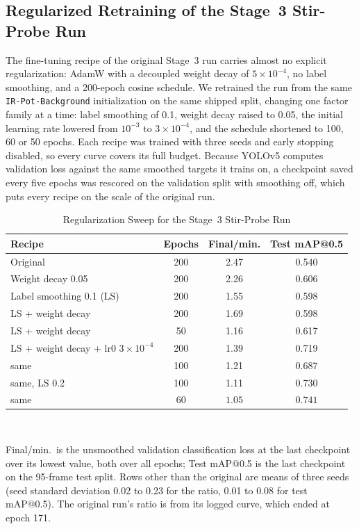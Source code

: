 ﻿\documentclass[journal]{IEEEtran}
\begin{document}
\subsection{Regularized Retraining of the Stage~3 Stir-Probe Run}
\label{sec:stir-reg}
The fine-tuning recipe of the original Stage~3 run carries almost no explicit regularization: AdamW with a decoupled weight decay of $5 \times 10^{-4}$, no label smoothing, and a 200-epoch cosine schedule. We retrained the run from the same \texttt{IR-Pot-Background} initialization on the same shipped split, changing one factor family at a time: label smoothing of 0.1, weight decay raised to 0.05, the initial learning rate lowered from $10^{-3}$ to $3 \times 10^{-4}$, and the schedule shortened to 100, 60 or 50 epochs. Each recipe was trained with three seeds and early stopping disabled, so every curve covers its full budget. Because YOLOv5 computes validation loss against the same smoothed targets it trains on, a checkpoint saved every five epochs was rescored on the validation split with smoothing off, which puts every recipe on the scale of the original run.

\begin{table}[!t]
\renewcommand{\arraystretch}{1.3}
\caption{Regularization Sweep for the Stage~3 Stir-Probe Run}
\label{tab:stirreg}
\centering
\footnotesize
\setlength{\tabcolsep}{3.5pt}
\begin{tabular}{l c c c}
\toprule
\textbf{Recipe} & \textbf{Epochs} & \textbf{Final/min.} & \textbf{Test mAP@0.5} \\
\midrule
Original & 200 & 2.47 & 0.540 \\
Weight decay 0.05 & 200 & 2.26 & 0.606 \\
Label smoothing 0.1 (LS) & 200 & 1.55 & 0.598 \\
LS + weight decay & 200 & 1.69 & 0.598 \\
LS + weight decay & 50 & 1.16 & 0.617 \\
LS + weight decay + lr0 $3 \times 10^{-4}$ & 200 & 1.39 & 0.719 \\
\quad same & 100 & 1.21 & 0.687 \\
\quad same, LS 0.2 & 100 & 1.11 & 0.730 \\
\quad same & 60 & $\mathbf{1.05}$ & $\mathbf{0.741}$ \\
\bottomrule
\end{tabular}
\\[2pt]
\parbox{\columnwidth}{\footnotesize Final/min.\ is the unsmoothed validation classification loss at the last checkpoint over its lowest value, both over all epochs; Test mAP@0.5 is the last checkpoint on the 95-frame test split. Rows other than the original are means of three seeds (seed standard deviation 0.02 to 0.23 for the ratio, 0.01 to 0.08 for test mAP@0.5). The original run's ratio is from its logged curve, which ended at epoch 171.}
\end{table}
\end{document}
